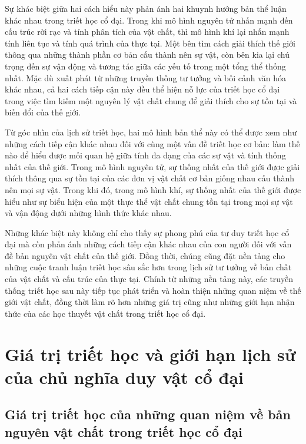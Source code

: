 \documentclass[14pt,a4paper]{extarticle}
\begin{document}
Sự khác biệt giữa hai cách hiểu này phản ánh hai khuynh hướng bản thể luận khác nhau trong triết học cổ đại. Trong khi mô hình nguyên tử nhấn mạnh đến cấu trúc rời rạc và tính phân tích của vật chất, thì mô hình khí lại nhấn mạnh tính liên tục và tính quá trình của thực tại. Một bên tìm cách giải thích thế giới thông qua những thành phần cơ bản cấu thành nên sự vật, còn bên kia lại chú trọng đến sự vận động và tương tác giữa các yếu tố trong một tổng thể thống nhất. Mặc dù xuất phát từ những truyền thống tư tưởng và bối cảnh văn hóa khác nhau, cả hai cách tiếp cận này đều thể hiện nỗ lực của triết học cổ đại trong việc tìm kiếm một nguyên lý vật chất chung để giải thích cho sự tồn tại và biến đổi của thế giới.

Từ góc nhìn của lịch sử triết học, hai mô hình bản thể này có thể được xem như những cách tiếp cận khác nhau đối với cùng một vấn đề triết học cơ bản: làm thế nào để hiểu được mối quan hệ giữa tính đa dạng của các sự vật và tính thống nhất của thế giới. Trong mô hình nguyên tử, sự thống nhất của thế giới được giải thích thông qua sự tồn tại của các đơn vị vật chất cơ bản giống nhau cấu thành nên mọi sự vật. Trong khi đó, trong mô hình khí, sự thống nhất của thế giới được hiểu như sự biểu hiện của một thực thể vật chất chung tồn tại trong mọi sự vật và vận động dưới những hình thức khác nhau.

Những khác biệt này không chỉ cho thấy sự phong phú của tư duy triết học cổ đại mà còn phản ánh những cách tiếp cận khác nhau của con người đối với vấn đề bản nguyên vật chất của thế giới. Đồng thời, chúng cũng đặt nền tảng cho những cuộc tranh luận triết học sâu sắc hơn trong lịch sử tư tưởng về bản chất của vật chất và cấu trúc của thực tại. Chính từ những nền tảng này, các truyền thống triết học sau này tiếp tục phát triển và hoàn thiện những quan niệm về thế giới vật chất, đồng thời làm rõ hơn những giá trị cũng như những giới hạn nhận thức của các học thuyết vật chất trong triết học cổ đại.

\section{Giá trị triết học và giới hạn lịch sử của chủ nghĩa duy vật cổ đại}

\subsection{Giá trị triết học của những quan niệm về bản nguyên vật chất trong triết học cổ đại}
\end{document}
